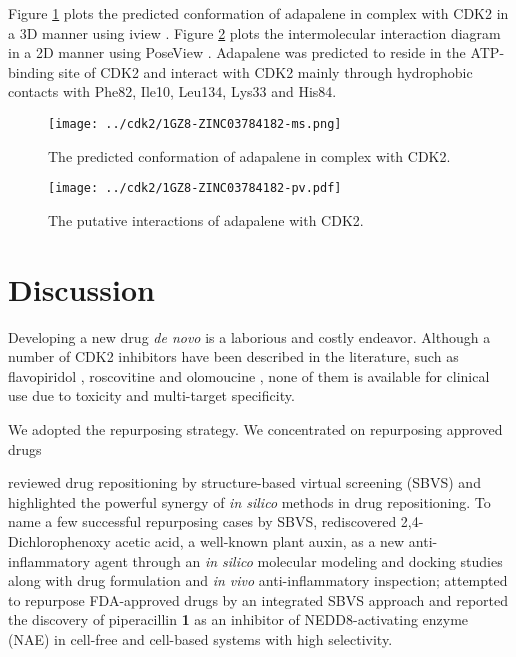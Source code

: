 Figure \ref{cdk2:1GZ8-ZINC03784182-ms} plots the predicted conformation of adapalene in complex with CDK2 in a 3D manner using iview \citep{1366}. Figure \ref{cdk2:1GZ8-ZINC03784182-pv} plots the intermolecular interaction diagram in a 2D manner using PoseView \citep{748}. Adapalene was predicted to reside in the ATP-binding site of CDK2 and interact with CDK2 mainly through hydrophobic contacts with Phe82, Ile10, Leu134, Lys33 and His84.

\begin{figure}
\centering
\texttt{[image: ../cdk2/1GZ8-ZINC03784182-ms.png]}
\caption{The predicted conformation of adapalene in complex with CDK2.}
\label{cdk2:1GZ8-ZINC03784182-ms}
\end{figure}

\begin{figure}
\centering
\texttt{[image: ../cdk2/1GZ8-ZINC03784182-pv.pdf]}
\caption{The putative interactions of adapalene with CDK2.}
\label{cdk2:1GZ8-ZINC03784182-pv}
\end{figure}

\section{Discussion}

Developing a new drug \textit{de novo} is a laborious and costly endeavor. Although a number of CDK2 inhibitors have been described in the literature, such as flavopiridol \citep{1596}, roscovitine \citep{1597} and olomoucine \citep{1598}, none of them is available for clinical use due to toxicity and multi-target specificity.

We adopted the repurposing strategy. We concentrated on repurposing approved drugs \citep{1023,944}

\citep{1384} reviewed drug repositioning by structure-based virtual screening (SBVS) and highlighted the powerful synergy of \textit{in silico} methods in drug repositioning. To name a few successful repurposing cases by SBVS, \citep{1507} rediscovered 2,4-Dichlorophenoxy acetic acid, a well-known plant auxin, as a new anti-inflammatory agent through an \textit{in silico} molecular modeling and docking studies along with drug formulation and \textit{in vivo} anti-inflammatory inspection; \citep{1506} attempted to repurpose FDA-approved drugs by an integrated SBVS approach and reported the discovery of piperacillin \textbf{1} as an inhibitor of NEDD8-activating enzyme (NAE) in cell-free and cell-based systems with high selectivity.

